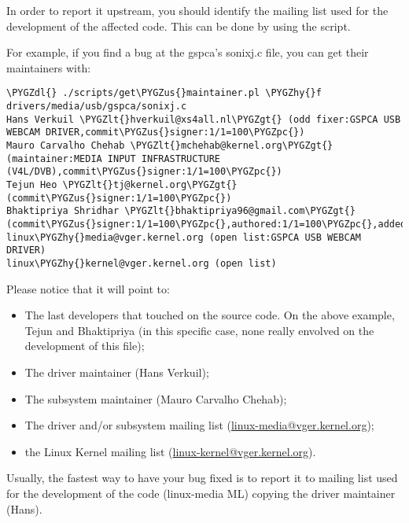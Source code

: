 \documentclass[a4paper,8pt,english]{sphinxmanual}
\def\PYGZus{\char`\_}
\def\PYGZlt{\char`\<}
\def\PYGZgt{\char`\>}
\def\PYGZpc{\char`\%}
\def\PYGZdl{\char`\$}
\def\PYGZhy{\char`\-}
\begin{document}
In order to report it upstream, you should identify the mailing list
used for the development of the affected code. This can be done by using
the  script.

For example, if you find a bug at the gspca's sonixj.c file, you can get
their maintainers with:

\begin{Verbatim}[commandchars=\\\{\}]
\PYGZdl{} ./scripts/get\PYGZus{}maintainer.pl \PYGZhy{}f drivers/media/usb/gspca/sonixj.c
Hans Verkuil \PYGZlt{}hverkuil@xs4all.nl\PYGZgt{} (odd fixer:GSPCA USB WEBCAM DRIVER,commit\PYGZus{}signer:1/1=100\PYGZpc{})
Mauro Carvalho Chehab \PYGZlt{}mchehab@kernel.org\PYGZgt{} (maintainer:MEDIA INPUT INFRASTRUCTURE (V4L/DVB),commit\PYGZus{}signer:1/1=100\PYGZpc{})
Tejun Heo \PYGZlt{}tj@kernel.org\PYGZgt{} (commit\PYGZus{}signer:1/1=100\PYGZpc{})
Bhaktipriya Shridhar \PYGZlt{}bhaktipriya96@gmail.com\PYGZgt{} (commit\PYGZus{}signer:1/1=100\PYGZpc{},authored:1/1=100\PYGZpc{},added\PYGZus{}lines:4/4=100\PYGZpc{},removed\PYGZus{}lines:9/9=100\PYGZpc{})
linux\PYGZhy{}media@vger.kernel.org (open list:GSPCA USB WEBCAM DRIVER)
linux\PYGZhy{}kernel@vger.kernel.org (open list)
\end{Verbatim}

Please notice that it will point to:
\begin{itemize}
\item {} 
The last developers that touched on the source code. On the above example,
Tejun and Bhaktipriya (in this specific case, none really envolved on the
development of this file);

\item {} 
The driver maintainer (Hans Verkuil);

\item {} 
The subsystem maintainer (Mauro Carvalho Chehab);

\item {} 
The driver and/or subsystem mailing list (\href{mailto:linux-media@vger.kernel.org}{linux-media@vger.kernel.org});

\item {} 
the Linux Kernel mailing list (\href{mailto:linux-kernel@vger.kernel.org}{linux-kernel@vger.kernel.org}).

\end{itemize}

Usually, the fastest way to have your bug fixed is to report it to mailing
list used for the development of the code (linux-media ML) copying the driver maintainer (Hans).
\end{document}
